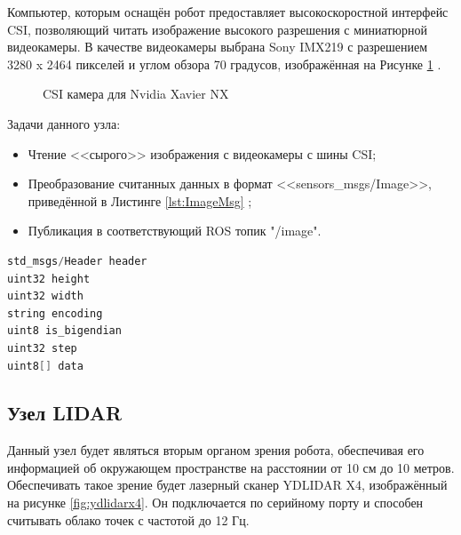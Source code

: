 \documentclass[12pt,a4paper]{scrartcl}
\begin{document}
			 	Компьютер, которым оснащён робот предоставляет высокоскоростной интерфейс CSI, позволяющий читать изображение высокого разрешения с миниатюрной видеокамеры. В качестве видеокамеры выбрана Sony IMX219 с разрешением 3280 x 2464 пикселей и углом обзора 70 градусов, изображённая на Рисунке \ref{fig:csiCam} . 
			 	\begin{figure}[h]
					\caption{CSI камера для Nvidia Xavier NX}
					\label{fig:csiCam}
				\end{figure}
				
				Задачи данного узла:
				\begin{itemize}
					\item Чтение <<сырого>> изображения с видеокамеры с шины CSI;
					\item Преобразование считанных данных в формат <<sensors\_msgs/Image>>, приведённой в Листинге \ref{lst:ImageMsg} ;
					\item Публикация в соответствующий ROS топик "/image".
				\end{itemize}
				
				\begin{lstlisting}[language=C,caption={Формат сообщения sensors\_msgs/Image},label={lst:ImageMsg}]
std_msgs/Header header
uint32 height
uint32 width
string encoding
uint8 is_bigendian
uint32 step
uint8[] data
				\end{lstlisting}
				
			\subsection{Узел LIDAR} \label{sec:LiDAR}
				Данный узел будет являться вторым органом зрения робота, обеспечивая его информацией об окружающем пространстве на расстоянии от 10 см до 10 метров. Обеспечивать такое зрение будет лазерный сканер YDLIDAR X4, изображённый на рисунке \ref{fig:ydlidarx4}\cite{bib:ydlidarx4}. Он подключается по серийному порту и способен считывать облако точек с частотой до 12 Гц\cite{bib:ydlidarx4}. 
				
\end{document}
